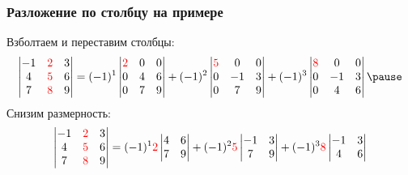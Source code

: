\begin{frame}
\frametitle{Разложение по столбцу на примере}
Взболтаем и переставим столбцы:
\[
    \begin{vmatrix}
        -1 & \red{2} & 3 \\
        4 & \red{5} & 6 \\
        7 & \red{8} & 9 \\
    \end{vmatrix}  =       
    (-1)^1 \begin{vmatrix}
        \red{2} & 0   & 0 \\
        0 & 4  & 6 \\
        0 & 7  & 9 \\
    \end{vmatrix} +
    (-1)^2 \begin{vmatrix}
        \red{5} & 0 & 0 \\
       0 & -1 & 3 \\
        0 & 7 & 9 \\
    \end{vmatrix} +
    (-1)^3\begin{vmatrix}
        \red{8} & 0 & 0 \\
        0 & -1 & 3 \\
        0 & 4 & 6 \\
    \end{vmatrix} \pause
\]
Снизим размерность:
\[
    \begin{vmatrix}
        -1 & \textcolor{red}{2} & 3 \\
        4 & \textcolor{red}{5} & 6 \\
        7 & \textcolor{red}{8} & 9 \\
    \end{vmatrix}  =       
    (-1)^1 \textcolor{red}{2} \begin{vmatrix}
         4  & 6 \\
         7  & 9 \\
    \end{vmatrix} +
    (-1)^2 \textcolor{red}{5}\begin{vmatrix}
        -1 & 3 \\
         7 & 9 \\
    \end{vmatrix} +
    (-1)^3 \textcolor{red}{8} \begin{vmatrix}
         -1 & 3 \\
         4 & 6 \\
    \end{vmatrix} 
\]




\end{frame}


